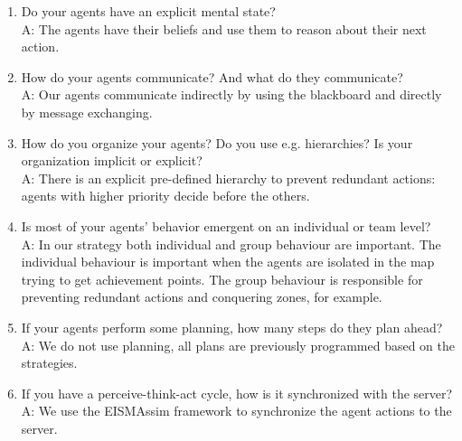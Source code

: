 \begin{enumerate}
    \item  Do your agents have an explicit mental state?\\
	A: The agents have their beliefs and use them to reason about their next action.%


	\item  How do your agents communicate? And what do they communicate?\\
	A: Our agents communicate indirectly by using the blackboard and directly by message exchanging. %
	
	\item  How do you organize your agents? Do you use e.g. hierarchies? Is your organization implicit or explicit?\\
	A: There is an explicit pre-defined hierarchy to prevent redundant actions: agents with higher priority decide before the others.%


	\item  Is most of your agents’ behavior emergent on an individual or team level?\\
	A: In our strategy both individual and group behaviour are important. The individual behaviour is important when the agents are isolated in the map trying to get achievement points. The group behaviour is responsible for preventing redundant actions and conquering zones, for example.%


	\item  If your agents perform some planning, how many steps do they plan ahead?\\
	A: We do not use planning, all plans are previously programmed based on the strategies. %

	\item  If you have a perceive-think-act cycle, how is it synchronized with the server? \\
	A: We use the EISMAssim framework \cite{behrens:2011} to synchronize the agent actions to the server.%
	
\end{enumerate}

